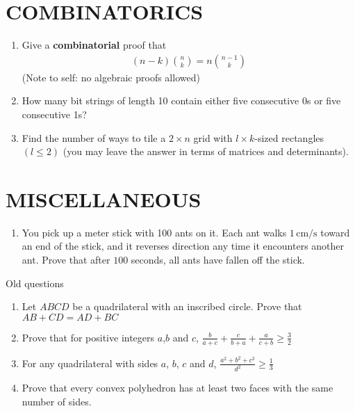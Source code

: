 \documentclass[12pt]{article}
\begin{document}
\section{COMBINATORICS}
\begin{enumerate}
    \item Give a \textbf{combinatorial} proof that 
    \begin{align*}
    (n-k)\binom{n}{k} = n\binom{n-1}{k}
    \end{align*}
    (Note to self: no algebraic proofs allowed)
    \item How many bit strings of length 10 contain either five consecutive 0s or five consecutive 1s?
    \item Find the number of ways to tile a $2 \times n$ grid with $l \times k$-sized rectangles $(l \leq 2)$ (you may leave the answer in terms of matrices and determinants).
\end{enumerate}



\section{MISCELLANEOUS}
\begin{enumerate}
\item You pick up a meter stick with 100 ants on it. Each ant walks \(1 \, \text{cm/s}\) toward an end of the stick, and it reverses direction any time it encounters another ant. Prove that after \(100\) seconds, all ants have fallen off the stick.

\end{enumerate}
Old questions
    
\begin{enumerate}
    \item Let $ABCD$ be a quadrilateral with an inscribed circle. Prove that $AB+CD=AD+BC$
    \item Prove that for positive integers $a$,$b$ and $c$, $\frac{b}{a+c} + \frac{c}{b+a} + \frac{a}{c+b} \geq \frac{3}{2}$
    \item For any quadrilateral with sides $a$, $b$, $c$ and $d$, $\frac{a^{2}+b^{2}+c^{2}}{d^{2}} \geq \frac{1}{3}$
    \item Prove that every convex polyhedron has at least two faces with the same number of sides.

\end{enumerate}
\pagebreak
\end{document}

